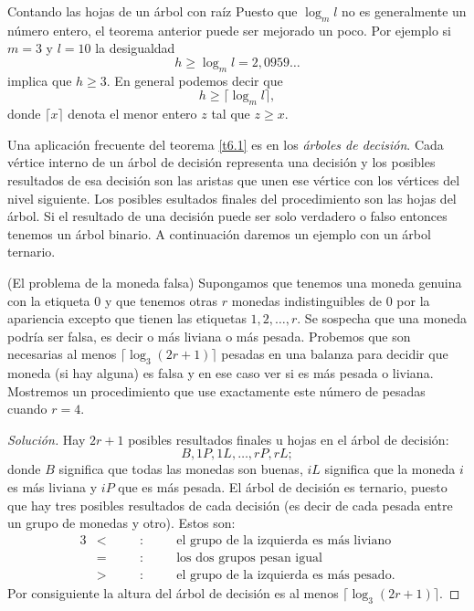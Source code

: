 \begin{section}{Contando las hojas de un árbol con raíz}
Puesto que $\log_ml$ no es generalmente un número entero, el teorema anterior puede ser mejorado un poco. Por ejemplo si $m=3$ y $l=10$ la desigualdad
$$
h \ge \log_ml=2,0959\ldots
$$
implica que $h\ge 3$. En general podemos decir que
$$
h\ge\lceil \log_ml\rceil,
$$
donde $\lceil x \rceil$ denota el menor entero $z$ tal que $z\ge
x$.

Una aplicación frecuente del teorema \ref{t6.1} es en los   \textit{árboles de decisión}. Cada vértice interno de un árbol de decisión representa una decisión y los posibles resultados de esa decisión son las aristas que unen ese vértice con los vértices del nivel siguiente. Los posibles  esultados finales del procedimiento son las hojas del árbol. Si el resultado de una decisión puede ser solo verdadero o falso entonces tenemos un árbol binario. A continuación daremos un ejemplo con un árbol ternario.

\begin{ejemplo} \label{monedafalsa}(El problema de la moneda falsa) Supongamos que tenemos una moneda genuina con la etiqueta $0$ y que tenemos otras $r$ monedas indistinguibles de $0$ por la apariencia excepto que tienen las etiquetas $1,2,\ldots,r$. Se sospecha que una moneda podría ser falsa, es decir o más liviana o más pesada. Probemos que son necesarias al menos $\lceil \log_3(2r+1)\rceil $ pesadas en una balanza para decidir que moneda (si hay alguna) es falsa y en ese caso ver si es más pesada o liviana. Mostremos un procedimiento que use exactamente este número de pesadas cuando $r=4$.
\end{ejemplo}
\begin{proof}[Solución] Hay $2r+1$ posibles resultados finales u hojas en el árbol de decisión: 
$$
B,1P,1L,\ldots,rP,rL;
$$
donde $B$ significa que todas las monedas son buenas, $iL$ significa que la moneda $i$ es más liviana y $iP$ que es más pesada. El árbol de decisión es ternario, puesto que hay tres posibles resultados de cada decisión (es decir de cada pesada entre un grupo de monedas y otro). Estos son:
\begin{alignat*}3
&<\quad & &:\quad& &\text{el grupo de la izquierda es más liviano}\\
&=\quad & &:\quad& &\text{los dos grupos pesan igual}\\
&>\quad & &:\quad& &\text{el grupo de la izquierda es más pesado.}
\end{alignat*}
Por consiguiente la altura del árbol de decisión es al menos $\lceil \log_3(2r+1)\rceil$.


\end{proof}
\end{section}
